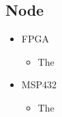 \documentclass[11pt]{article}
\begin{document}
\subsection{Node}
\begin{itemize}
\item FPGA 

\begin{itemize}
\item The 
\end{itemize}

\item MSP432

\begin{itemize}
\item The 
\end{itemize}

 
\end{itemize}
\end{document}
